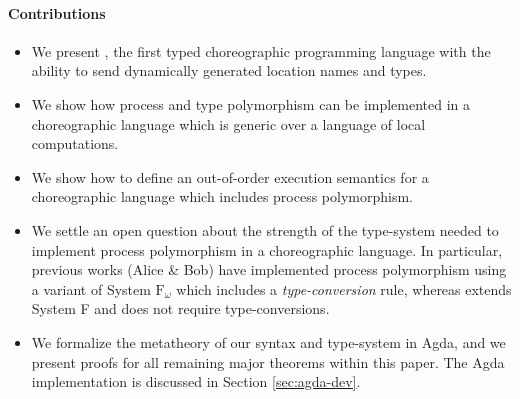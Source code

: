 \paragraph{Contributions}
\begin{itemize}
	\item We present \langname, the first typed choreographic programming language with the ability to send dynamically generated location names and types.
	\item We show how process  and type polymorphism can be implemented in a choreographic language which is generic over a language of local computations.
	\item We show how to define an out-of-order execution semantics for a choreographic language which includes process polymorphism.
	\item We settle an open question about the strength of the type-system needed to implement process polymorphism in a choreographic language.
  In particular, previous works (Alice \& Bob) have implemented process polymorphism using a variant of System $\text{F}_\omega$ which includes a \emph{type-conversion} rule, whereas \langname extends System F and does not require type-conversions.
	\item We formalize the metatheory of our syntax and type-system in Agda, and we present proofs for all remaining major theorems within this paper.
  The Agda implementation is discussed in Section \ref{sec:agda-dev}.
\end{itemize}

